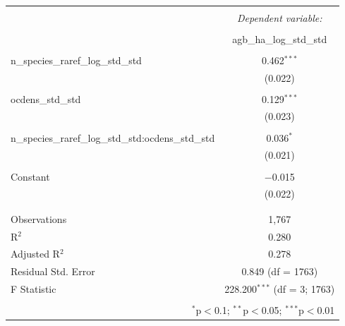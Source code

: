 
\begin{table}[!htbp] \centering 
  \caption{} 
  \label{soil_div_int_mod} 
\begin{tabular}{@{\extracolsep{5pt}}lc} 
\\[-1.8ex]\hline 
\hline \\[-1.8ex] 
 & \multicolumn{1}{c}{\textit{Dependent variable:}} \\ 
\cline{2-2} 
\\[-1.8ex] & agb\_ha\_log\_std\_std \\ 
\hline \\[-1.8ex] 
 n\_species\_raref\_log\_std\_std & 0.462$^{***}$ \\ 
  & (0.022) \\ 
  & \\ 
 ocdens\_std\_std & 0.129$^{***}$ \\ 
  & (0.023) \\ 
  & \\ 
 n\_species\_raref\_log\_std\_std:ocdens\_std\_std & 0.036$^{*}$ \\ 
  & (0.021) \\ 
  & \\ 
 Constant & $-$0.015 \\ 
  & (0.022) \\ 
  & \\ 
\hline \\[-1.8ex] 
Observations & 1,767 \\ 
R$^{2}$ & 0.280 \\ 
Adjusted R$^{2}$ & 0.278 \\ 
Residual Std. Error & 0.849 (df = 1763) \\ 
F Statistic & 228.200$^{***}$ (df = 3; 1763) \\ 
\hline 
\hline \\[-1.8ex] 
\multicolumn{2}{r}{$^{*}$p$<$0.1; $^{**}$p$<$0.05; $^{***}$p$<$0.01} \\ 
\end{tabular} 
\end{table} 
